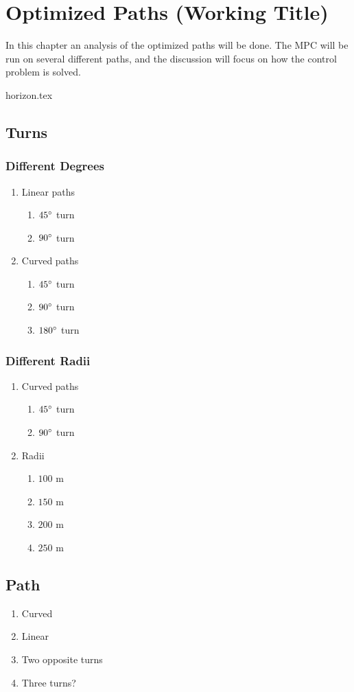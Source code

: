 \chapter{Optimized Paths (Working Title)}


In this chapter an analysis of the optimized paths will be done. The MPC will be run on several different paths, and the discussion will focus on how the control problem is solved.

{horizon.tex}

\section{Turns}

\subsection{Different Degrees}

\begin{enumerate}
	\item Linear paths
	\begin{enumerate}
		\item $45 \degree$ turn
		\item $90 \degree$ turn
	\end{enumerate}
	\item Curved paths
	\begin{enumerate}
		\item $45 \degree$ turn
		\item $90 \degree$ turn
		\item $180 \degree$ turn
	\end{enumerate}
\end{enumerate}

\subsection{Different Radii}

\begin{enumerate}
	\item Curved paths
	\begin{enumerate}
		\item $45 \degree$ turn
		\item $90 \degree$ turn
	\end{enumerate}
	\item Radii
	\begin{enumerate}
		\item $100$ m
		\item $150$ m
		\item $200$ m
		\item $250$ m
	\end{enumerate}
\end{enumerate}



\section{Path}

\begin{enumerate}
	\item Curved
	\item Linear
	\item Two opposite turns
	\item Three turns?
\end{enumerate}


